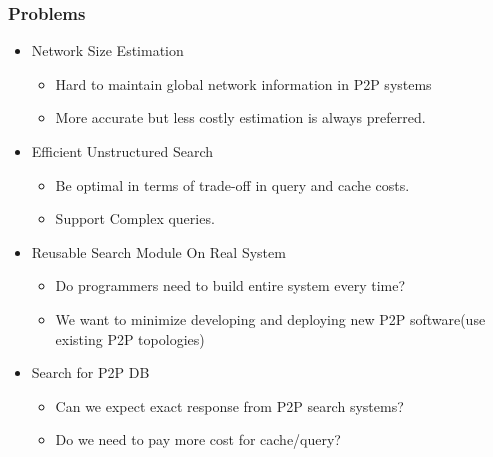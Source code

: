 \documentclass[red]{beamer}
\begin{document}
\begin{frame}
\frametitle{Problems}
\begin{itemize}
\item<1> Network Size Estimation
\begin{itemize}
\item Hard to maintain global network information in P2P systems
\item More accurate but less costly estimation is always preferred. 
\end{itemize}
\item<2> Efficient Unstructured Search
\begin{itemize}
\item Be optimal in terms of trade-off in query and cache costs.
\item Support Complex queries.
\end{itemize}
\item<3> Reusable Search Module On Real System
\begin{itemize}
\item Do programmers need to build entire system every time?
\item We want to minimize developing and deploying new P2P software(use existing P2P topologies)
\end{itemize}
\item<4-> Search for P2P DB
\begin{itemize}
\item Can we expect exact response from P2P search systems?
\item Do we need to pay more cost for cache/query?
\end{itemize}
\end{itemize}
\end{frame}
\end{document}
